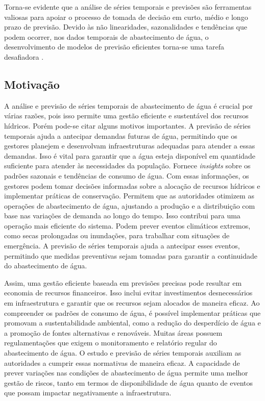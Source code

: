 Torna-se evidente que a análise de séries temporais e previsões são ferramentas valiosas para apoiar o processo de tomada de decisão em curto, médio e longo prazo de previsão. Devido às não linearidades, sazonalidades e tendências que podem ocorrer, nos dados temporais de abastecimento de água, o desenvolvimento de modelos de previsão eficientes torna-se uma tarefa desafiadora \cite{mateus}.



\subsection{Motiva\c c\~ao} 
\label{subsubsec:motivacao}

A análise e previsão de séries temporais de abastecimento de água é crucial por várias razões, pois isso permite uma gestão eficiente e sustentável dos recursos hídricos. Porém pode-se citar alguns motivos importantes. A previsão de séries temporais ajuda a antecipar demandas futuras de água, permitindo que os gestores planejem e desenvolvam infraestruturas adequadas para atender a essas demandas. Isso é vital para garantir que a água esteja disponível em quantidade suficiente para atender às necessidades da população. Fornece \textit{insights} sobre os padrões sazonais e tendências de consumo de água. Com essas informações, os gestores podem tomar decisões informadas sobre a alocação de recursos hídricos e implementar práticas de conservação. Permitem que as autoridades otimizem as operações de abastecimento de água, ajustando a produção e a distribuição com base nas variações de demanda ao longo do tempo. Isso contribui para uma operação mais eficiente do sistema. Podem prever eventos climáticos extremos, como secas prolongadas ou inundações, para trabalhar com situações de emergência. A previsão de séries temporais ajuda a antecipar esses eventos, permitindo que medidas preventivas sejam tomadas para garantir a continuidade do abastecimento de água.

Assim, uma gestão eficiente baseada em previsões precisas pode resultar em economia de recursos financeiros. Isso inclui evitar investimentos desnecessários em infraestrutura e garantir que os recursos sejam alocados de maneira eficaz. Ao compreender os padrões de consumo de água, é possível implementar práticas que promovam a sustentabilidade ambiental, como a redução do desperdício de água e a promoção de fontes alternativas e renováveis. Muitas áreas possuem regulamentações que exigem o monitoramento e relatório regular do abastecimento de água. O estudo e previsão de séries temporais auxiliam as autoridades a cumprir essas normativas de maneira eficaz. A capacidade de prever variações nas condições de abastecimento de água permite uma melhor gestão de riscos, tanto em termos de disponibilidade de água quanto de eventos que possam impactar negativamente a infraestrutura.

